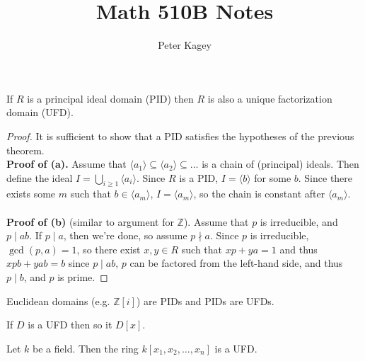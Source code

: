 \documentclass{article}
\newenvironment{note}[1][Note.]{
  \begin{trivlist} \item[\hskip \labelsep {\bfseries #1}]
}{\end{trivlist}}
\newenvironment{theorem}[1][Theorem.]{
  \begin{trivlist} \item[\hskip \labelsep {\bfseries #1}]
}{\end{trivlist}}
\newcommand{\ang}[1]{\langle #1 \rangle}
\begin{document}
\title{Math 510B Notes}
\author{Peter Kagey}

\maketitle

\begin{theorem}[Corollary.]
  If $R$ is a principal ideal domain (PID) then $R$ is also a unique factorization domain (UFD).
\end{theorem}

\begin{proof}
  It is sufficient to show that a PID satisfies the hypotheses of the previous theorem.
  \\
  \textbf{Proof of (a).}
  Assume that $\ang{a_1} \subseteq \ang{a_2} \subseteq \hdots$ is a chain of
  (principal) ideals. Then define the ideal $I = \bigcup_{i\geq 1} \ang{a_i}$.
  Since $R$ is a PID, $I = \ang b$ for some $b$.
  Since there exists some $m$ such that $b \in \ang{a_m}$, $I = \ang{a_m}$, so
  the chain is constant after $\ang{a_m}$.
  \\~\\
  \textbf{Proof of (b)} (similar to argument for $\mathbb Z$).
  Assume that $p$ is irreducible, and $p \mid ab$. If $p \mid a$, then we're done, so
  assume $p \nmid a$. Since $p$ is irreducible, $\gcd(p, a) = 1$, so there exist
  $x, y \in R$ such that $xp + ya = 1$ and thus $xpb + yab = b$ since
  $p \mid ab$, $p$ can be factored from the left-hand side, and thus $p \mid b$,
  and $p$ is prime.
\end{proof}

\begin{note}
  Euclidean domains (e.g. $\mathbb Z[i]$) are PIDs and PIDs are UFDs.
\end{note}

\begin{theorem}
  If $D$ is a UFD then so it $D[x]$.
\end{theorem}

\begin{theorem}[Corollary.]
  Let $k$ be a field. Then the ring $k[x_1, x_2, \hdots, x_n]$ is a UFD.
\end{theorem}
\end{document}
